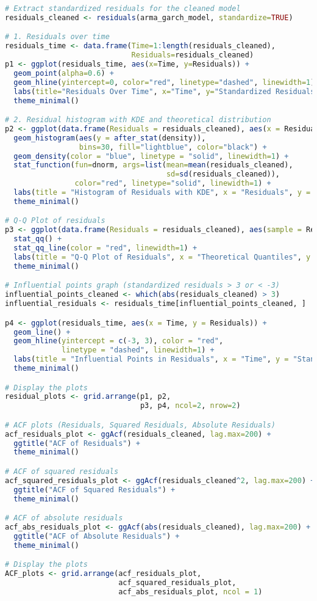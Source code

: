 \documentclass{article}
\newcommand{\1}{\mathbbm{1}}
\theoremstyle{definition}
\begin{document}
\begin{lstlisting}[language=R]
# Extract standardized residuals for the cleaned model
residuals_cleaned <- residuals(arma_garch_model, standardize=TRUE)

# 1. Residuals over time
residuals_time <- data.frame(Time=1:length(residuals_cleaned), 
                             Residuals=residuals_cleaned)
p1 <- ggplot(residuals_time, aes(x=Time, y=Residuals)) +
  geom_point(alpha=0.6) +
  geom_hline(yintercept=0, color="red", linetype="dashed", linewidth=1) +
  labs(title="Residuals Over Time", x="Time", y="Standardized Residuals") +
  theme_minimal()

# 2. Residual histogram with KDE and theoretical distribution
p2 <- ggplot(data.frame(Residuals = residuals_cleaned), aes(x = Residuals)) +
  geom_histogram(aes(y = after_stat(density)), 
                 bins=30, fill="lightblue", color="black") +
  geom_density(color = "blue", linetype = "solid", linewidth=1) +
  stat_function(fun=dnorm, args=list(mean=mean(residuals_cleaned), 
                                     sd=sd(residuals_cleaned)), 
                color="red", linetype="solid", linewidth=1) +
  labs(title = "Histogram of Residuals with KDE", x = "Residuals", y = "Density") +
  theme_minimal()

# Q-Q Plot of residuals
p3 <- ggplot(data.frame(Residuals = residuals_cleaned), aes(sample = Residuals)) +
  stat_qq() +
  stat_qq_line(color = "red", linewidth=1) +
  labs(title = "Q-Q Plot of Residuals", x = "Theoretical Quantiles", y = "Sample Quantiles") +
  theme_minimal()

# Influential points graph (standardized residuals > 3 or < -3)
influential_points_cleaned <- which(abs(residuals_cleaned) > 3)
influential_residuals <- residuals_time[influential_points_cleaned, ]

p4 <- ggplot(residuals_time, aes(x = Time, y = Residuals)) +
  geom_line() +
  geom_hline(yintercept = c(-3, 3), color = "red", 
             linetype = "dashed", linewidth=1) +
  labs(title = "Influential Points in Residuals", x = "Time", y = "Standardized Residuals") +
  theme_minimal()

# Display the plots
residual_plots <- grid.arrange(p1, p2, 
                               p3, p4, ncol=2, nrow=2)

# ACF plots (Residuals, Squared Residuals, Absolute Residuals)
acf_residuals_plot <- ggAcf(residuals_cleaned, lag.max=200) +
  ggtitle("ACF of Residuals") +
  theme_minimal()

# ACF of squared residuals
acf_squared_residuals_plot <- ggAcf(residuals_cleaned^2, lag.max=200) +
  ggtitle("ACF of Squared Residuals") +
  theme_minimal()

# ACF of absolute residuals
acf_abs_residuals_plot <- ggAcf(abs(residuals_cleaned), lag.max=200) +
  ggtitle("ACF of Absolute Residuals") +
  theme_minimal()

# Display the plots
ACF_plots <- grid.arrange(acf_residuals_plot, 
                          acf_squared_residuals_plot, 
                          acf_abs_residuals_plot, ncol = 1)
\end{lstlisting}
\end{document}
